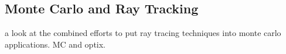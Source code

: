 \subsection{Monte Carlo and Ray Tracking}

a look at the combined efforts to put ray tracing techniques into monte carlo applications.
MC and optix.